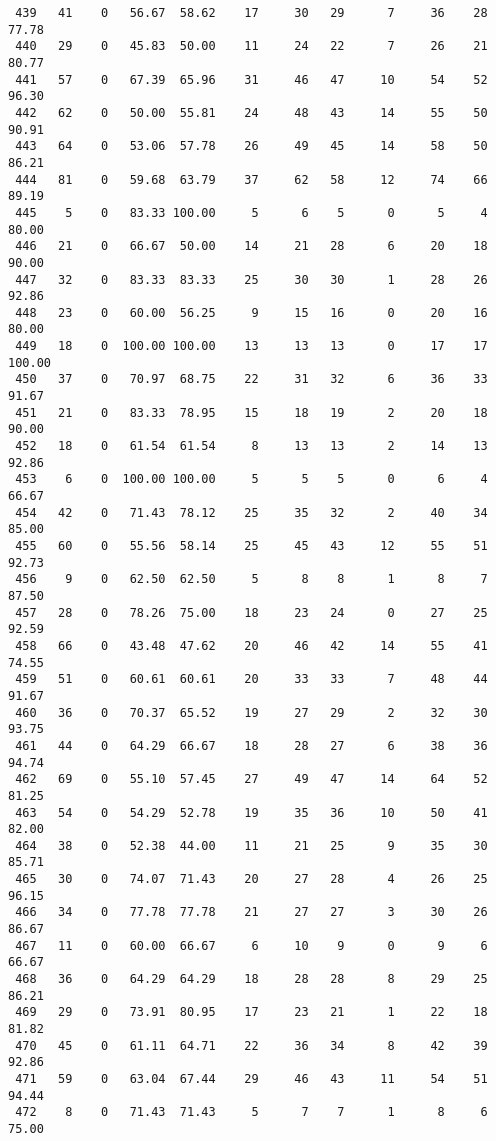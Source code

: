 \begin{verbatim}
 439   41    0   56.67  58.62    17     30   29      7     36    28    77.78
 440   29    0   45.83  50.00    11     24   22      7     26    21    80.77
 441   57    0   67.39  65.96    31     46   47     10     54    52    96.30
 442   62    0   50.00  55.81    24     48   43     14     55    50    90.91
 443   64    0   53.06  57.78    26     49   45     14     58    50    86.21
 444   81    0   59.68  63.79    37     62   58     12     74    66    89.19
 445    5    0   83.33 100.00     5      6    5      0      5     4    80.00
 446   21    0   66.67  50.00    14     21   28      6     20    18    90.00
 447   32    0   83.33  83.33    25     30   30      1     28    26    92.86
 448   23    0   60.00  56.25     9     15   16      0     20    16    80.00
 449   18    0  100.00 100.00    13     13   13      0     17    17   100.00
 450   37    0   70.97  68.75    22     31   32      6     36    33    91.67
 451   21    0   83.33  78.95    15     18   19      2     20    18    90.00
 452   18    0   61.54  61.54     8     13   13      2     14    13    92.86
 453    6    0  100.00 100.00     5      5    5      0      6     4    66.67
 454   42    0   71.43  78.12    25     35   32      2     40    34    85.00
 455   60    0   55.56  58.14    25     45   43     12     55    51    92.73
 456    9    0   62.50  62.50     5      8    8      1      8     7    87.50
 457   28    0   78.26  75.00    18     23   24      0     27    25    92.59
 458   66    0   43.48  47.62    20     46   42     14     55    41    74.55
 459   51    0   60.61  60.61    20     33   33      7     48    44    91.67
 460   36    0   70.37  65.52    19     27   29      2     32    30    93.75
 461   44    0   64.29  66.67    18     28   27      6     38    36    94.74
 462   69    0   55.10  57.45    27     49   47     14     64    52    81.25
 463   54    0   54.29  52.78    19     35   36     10     50    41    82.00
 464   38    0   52.38  44.00    11     21   25      9     35    30    85.71
 465   30    0   74.07  71.43    20     27   28      4     26    25    96.15
 466   34    0   77.78  77.78    21     27   27      3     30    26    86.67
 467   11    0   60.00  66.67     6     10    9      0      9     6    66.67
 468   36    0   64.29  64.29    18     28   28      8     29    25    86.21
 469   29    0   73.91  80.95    17     23   21      1     22    18    81.82
 470   45    0   61.11  64.71    22     36   34      8     42    39    92.86
 471   59    0   63.04  67.44    29     46   43     11     54    51    94.44
 472    8    0   71.43  71.43     5      7    7      1      8     6    75.00

\end{verbatim}
